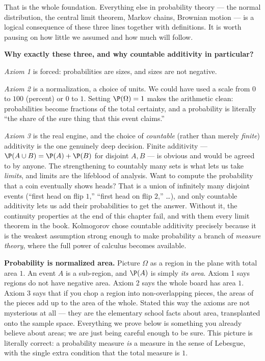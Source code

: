 That is the whole foundation. Everything else in probability theory --- the
normal distribution, the central limit theorem, Markov chains, Brownian motion ---
is a logical consequence of these three lines together with definitions. It is
worth pausing on how little we assumed and how much will follow.

\begin{whybox}
\textbf{Why exactly these three, and why countable additivity in particular?}

\emph{Axiom 1} is forced: probabilities are sizes, and sizes are not negative.

\emph{Axiom 2} is a normalization, a choice of units. We could have used a scale
from $0$ to $100$ (percent) or $0$ to $1$. Setting $\P(\Omega) = 1$ makes the
arithmetic clean: probabilities become fractions of the total certainty, and a
probability is literally ``the share of the sure thing that this event claims.''

\emph{Axiom 3} is the real engine, and the choice of \emph{countable} (rather
than merely \emph{finite}) additivity is the one genuinely deep decision. Finite
additivity --- $\P(A \cup B) = \P(A) + \P(B)$ for disjoint $A, B$ --- is obvious
and would be agreed to by anyone. The strengthening to countably many sets is
what lets us take \emph{limits}, and limits are the lifeblood of analysis. Want
to compute the probability that a coin eventually shows heads? That is a union of
infinitely many disjoint events (``first head on flip $1$,'' ``first head on flip
$2$,'' \dots), and only countable additivity lets us add their probabilities to
get the answer. Without it, the continuity properties at the end of this chapter
fail, and with them every limit theorem in the book. Kolmogorov chose countable
additivity precisely because it is the weakest assumption strong enough to make
probability a branch of \emph{measure theory}, where the full power of calculus
becomes available.
\end{whybox}

\begin{happeningbox}
\textbf{Probability is normalized area.} Picture $\Omega$ as a region in the
plane with total area $1$. An event $A$ is a sub-region, and $\P(A)$ is simply
\emph{its area}. Axiom 1 says regions do not have negative area. Axiom 2 says the
whole board has area $1$. Axiom 3 says that if you chop a region into
non-overlapping pieces, the areas of the pieces add up to the area of the whole.
Stated this way the axioms are not mysterious at all --- they are the elementary
school facts about area, transplanted onto the sample space. Everything we prove
below is something you already believe about areas; we are just being careful
enough to be sure. This picture is literally correct: a probability measure
\emph{is} a measure in the sense of Lebesgue, with the single extra condition
that the total measure is $1$.
\end{happeningbox}

